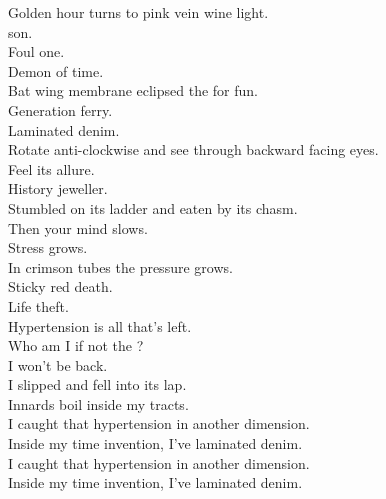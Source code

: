 Golden hour turns to pink vein wine light. \\
 son. \\
Foul one. \\
Demon of time. \\
Bat wing membrane eclipsed the  for fun. \\

Generation ferry. \\
Laminated denim. \\
Rotate anti-clockwise and see through backward facing eyes. \\
Feel its allure. \\
History jeweller. \\
Stumbled on its ladder and eaten by its chasm. \\
Then your mind slows. \\
Stress grows. \\
In crimson tubes the pressure grows. \\
Sticky red death. \\
Life theft. \\
Hypertension is all that's left. \\

Who am I if not the ? \\
I won't be back. \\
I slipped and fell into its lap. \\
Innards boil inside my tracts. \\

I caught that hypertension in another dimension. \\
Inside my time invention, I've laminated denim. \\

I caught that hypertension in another dimension. \\
Inside my time invention, I've laminated denim. \\

